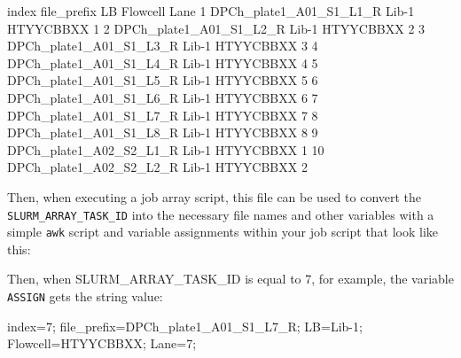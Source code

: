 \documentclass[]{krantz}
\makeatletter
\newenvironment{Shaded}{\begin{snugshade}}{\end{snugshade}}
\newcommand{\BuiltInTok}[1]{#1}
\newcommand{\CommentTok}[1]{\textcolor[rgb]{0.37,0.37,0.37}{\textit{#1}}}
\newcommand{\ExtensionTok}[1]{#1}
\newcommand{\FunctionTok}[1]{\textcolor[rgb]{0,0,0}{#1}}
\newcommand{\NormalTok}[1]{#1}
\newcommand{\StringTok}[1]{\textcolor[rgb]{0.5,0.5,0.5}{#1}}
\newcommand{\VariableTok}[1]{\textcolor[rgb]{0,0,0}{#1}}
\newenvironment{kframe}{%
\medskip{}
\setlength{\fboxsep}{.8em}
 \def\at@end@of@kframe{}%
 \ifinner\ifhmode%
  \def\at@end@of@kframe{\end{minipage}}%
  \begin{minipage}{\columnwidth}%
 \fi\fi%
 \def\FrameCommand##1{\hskip\@totalleftmargin \hskip-\fboxsep
 \colorbox{shadecolor}{##1}\hskip-\fboxsep
     \hskip-\linewidth \hskip-\@totalleftmargin \hskip\columnwidth}%
 \MakeFramed {\advance\hsize-\width
   \@totalleftmargin\z@ \linewidth\hsize
   \@setminipage}}%
 {\par\unskip\endMakeFramed%
 \at@end@of@kframe}
\renewenvironment{Shaded}{\begin{kframe}}{\end{kframe}}
\makeatother
\begin{document}
\begin{Shaded}
\begin{Highlighting}[]
\ExtensionTok{index}\NormalTok{   file_prefix LB  Flowcell    Lane}
\ExtensionTok{1}\NormalTok{   DPCh_plate1_A01_S1_L1_R Lib-1   HTYYCBBXX   1}
\ExtensionTok{2}\NormalTok{   DPCh_plate1_A01_S1_L2_R Lib-1   HTYYCBBXX   2}
\ExtensionTok{3}\NormalTok{   DPCh_plate1_A01_S1_L3_R Lib-1   HTYYCBBXX   3}
\ExtensionTok{4}\NormalTok{   DPCh_plate1_A01_S1_L4_R Lib-1   HTYYCBBXX   4}
\ExtensionTok{5}\NormalTok{   DPCh_plate1_A01_S1_L5_R Lib-1   HTYYCBBXX   5}
\ExtensionTok{6}\NormalTok{   DPCh_plate1_A01_S1_L6_R Lib-1   HTYYCBBXX   6}
\ExtensionTok{7}\NormalTok{   DPCh_plate1_A01_S1_L7_R Lib-1   HTYYCBBXX   7}
\ExtensionTok{8}\NormalTok{   DPCh_plate1_A01_S1_L8_R Lib-1   HTYYCBBXX   8}
\ExtensionTok{9}\NormalTok{   DPCh_plate1_A02_S2_L1_R Lib-1   HTYYCBBXX   1}
\ExtensionTok{10}\NormalTok{  DPCh_plate1_A02_S2_L2_R Lib-1   HTYYCBBXX   2}
\end{Highlighting}
\end{Shaded}

Then, when executing a job array script, this file can be used to
convert the \texttt{SLURM\_ARRAY\_TASK\_ID} into the necessary file names
and other variables with a simple \texttt{awk} script and
variable assignments within your job script
that look like this:

\begin{Shaded}
\end{Shaded}

Then, when SLURM\_ARRAY\_TASK\_ID is equal to 7, for example, the variable
\texttt{ASSIGN} gets the string value:

\begin{Shaded}
\begin{Highlighting}[]
\VariableTok{index=}\NormalTok{7; }\VariableTok{file_prefix=}\NormalTok{DPCh_plate1_A01_S1_L7_R; }\VariableTok{LB=}\NormalTok{Lib-1; }\VariableTok{Flowcell=}\NormalTok{HTYYCBBXX; }\VariableTok{Lane=}\NormalTok{7;}
\end{Highlighting}
\end{Shaded}
\end{document}
